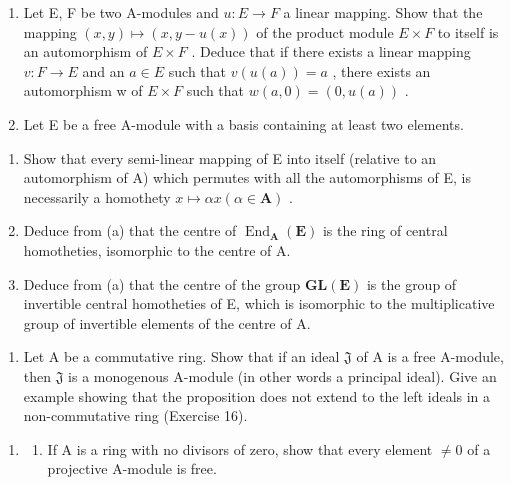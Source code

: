 \begin{enumerate}
\def\labelenumi{\arabic{enumi}.}
\setcounter{enumi}{24}
\item
  Let E, F be two A-modules and \(u: E \to F\) a linear mapping. Show that the mapping \((x, y) \mapsto (x, y - u(x))\) of the product module \(E \times F\) to itself is an automorphism of \(E \times F\) . Deduce that if there exists a linear mapping \(v: F \to E\) and an \(a \in E\) such that \(v(u(a)) = a\) , there exists an automorphism w of \(E \times F\) such that \(w(a, 0) = (0, u(a))\) .
\item
  Let E be a free A-module with a basis containing at least two elements.
\end{enumerate}

\begin{enumerate}
\def\labelenumi{(\alph{enumi})}
\item
  Show that every semi-linear mapping of E into itself (relative to an automorphism of A) which permutes with all the automorphisms of E, is necessarily a homothety \(x \mapsto \alpha x (\alpha \in \mathbf{A})\) .
\item
  Deduce from (a) that the centre of \(\operatorname{End}_{\mathbf{A}}(\mathbf{E})\) is the ring of central homotheties, isomorphic to the centre of A.
\item
  Deduce from (a) that the centre of the group \(\mathbf{GL}(\mathbf{E})\) is the group of invertible central homotheties of E, which is isomorphic to the multiplicative group of invertible elements of the centre of A.
\end{enumerate}

\begin{enumerate}
\def\labelenumi{\arabic{enumi}.}
\setcounter{enumi}{26}
\tightlist
\item
  Let A be a commutative ring. Show that if an ideal \(\mathfrak{J}\) of A is a free A-module, then \(\mathfrak{J}\) is a monogenous A-module (in other words a principal ideal). Give an example showing that the proposition does not extend to the left ideals in a non-commutative ring (Exercise 16).
\end{enumerate}

\BourbakiExercisesSection

\begin{enumerate}
\def\labelenumi{\arabic{enumi}.}
\tightlist
\item
  \begin{enumerate}
  \def\labelenumii{(\alph{enumii})}
  \tightlist
  \item
    If A is a ring with no divisors of zero, show that every element \(\neq0\) of a projective A-module is free.
  \end{enumerate}
\end{enumerate}

